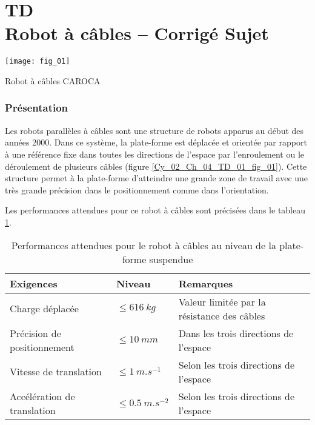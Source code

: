 \chapter*{TD  \\ 
Robot à câbles -- 
\ifprof Corrigé \else Sujet \fi}

\iflivret {} \else
\ifprof  {} \else \fi
\fi

\setcounter{question}{0}

\begin{marginfigure}
\centering
\texttt{[image: fig\_01]}
\caption{Robot à câbles CAROCA \label{Cy_02_Ch_04_TD_01_fig_01}}
\end{marginfigure}


\subsection*{Présentation}
 Les robots parallèles à câbles sont une structure de robots apparus au début des années 2000. Dans ce système, la plate-forme est déplacée et orientée par rapport à une référence fixe dans toutes les directions de l’espace par l’enroulement ou le déroulement de plusieurs câbles (figure \ref{Cy_02_Ch_04_TD_01_fig_01}). Cette structure permet à la plate-forme d’atteindre une grande zone de travail avec une très grande précision dans le positionnement comme dans l’orientation.

 Les performances attendues pour ce robot à câbles sont précisées dans le tableau \ref{Cy_02_Ch_04_TD_01_tab_01}.

\begin{table}[!h]
\centering
\begin{tabular}{llp{5.5cm}}
\hline
\textbf{Exigences} & \textbf{Niveau} & \textbf{Remarques} \\
\hline
Charge déplacée & $\leq \SI{616}{kg}$ & Valeur limitée par la résistance des câbles \\
Précision de positionnement & $\leq \SI{10}{mm}$ & Dans les trois directions de l’espace \\
Vitesse de translation & $\leq \SI{1}{m.s^{-1}}$ & Selon les trois directions de l’espace \\
Accélération de translation & $\leq  \SI{0,5}{m.s^{-2}}$ & Selon les trois directions de l’espace \\
\hline
\end{tabular}
\caption{Performances attendues pour le robot à câbles au niveau de la plate-forme suspendue \label{Cy_02_Ch_04_TD_01_tab_01}}
\end{table}

